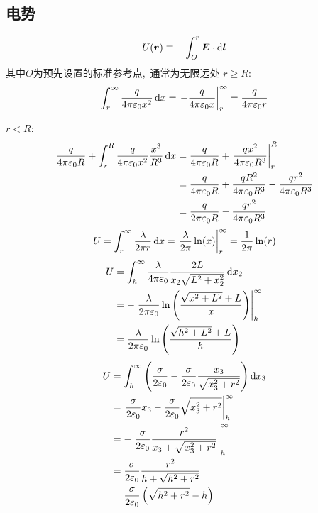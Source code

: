 \subsection{电势}
\begin{equation}
    U(\boldsymbol{r})\equiv-\int_{O}^{r}\boldsymbol{E}\cdot\dif\boldsymbol{l}
\end{equation}
其中$O$为预先设置的标准参考点, \,通常为无限远处
$r\ge R$:
\begin{align*}
    \int_{r}^{\infty}\dfrac{q }{4\pi\varepsilon_0x^2}\dif x=
    \left.-\dfrac{q }{4\pi\varepsilon_0x}\right|_{r}^{\infty}
    =\dfrac{q }{4\pi\varepsilon_0r}
\end{align*}

$r<R$:
\begin{align*}
    \dfrac{q }{4\pi\varepsilon_0R}+\int_{r}^{R}\dfrac{q }{4\pi\varepsilon_0x^2}\frac{x^3}{R^3}\dif x
    &=\dfrac{q }{4\pi\varepsilon_0R}+\left.\dfrac{qx^2}{4\pi\varepsilon_0R^3}\right|_{r}^{R}\\
    &=\dfrac{q }{4\pi\varepsilon_0R}
    +\dfrac{qR^2}{4\pi\varepsilon_0R^3}
    -\dfrac{qr^2}{4\pi\varepsilon_0R^3}\\
    &=\dfrac{q }{2\pi\varepsilon_0R}-\dfrac{qr^2}{4\pi\varepsilon_0R^3}
\end{align*}
\begin{align*}
    U=\int_r^\infty\frac{\lambda}{2\pi r}\dif x=
    \left.\frac{\lambda}{2\pi}\ln(x)\right|_r^\infty
    =\frac{1}{2\pi}\ln(r)
\end{align*}
\begin{align*}
    U&=\int_{h}^{\infty}\frac{\lambda}{4\pi\varepsilon_0}\frac{2L}{x_2\sqrt{L^2+x_2^2}}\dif x_2\\
    &=-\left.\frac{\lambda}{2\pi\varepsilon_0}\ln\left(\frac{\sqrt{x^2+L^2}+L}{x}\right)\right|_{h}^{\infty}
    \\
&=\frac{\lambda}{2\pi\varepsilon_0}\ln\left(\frac{\sqrt{h^2+L^2}+L}{h}\right)
\end{align*}
\label{圆片上方电势}
\begin{align*}
    U&=\int_{h}^{\infty}\left(\frac{\sigma }{2\varepsilon_0}
    -\frac{\sigma }{2\varepsilon_0}\frac{x_3}{\sqrt{x_3^2+r^2}}\right)\dif x_3\\
    &=\left.\frac{\sigma }{2\varepsilon_0}x_3
    -\frac{\sigma }{2\varepsilon_0}{\sqrt{x_3^2+r^2}}\right|_{h}^{\infty}\\
    &=-\left.\frac{\sigma }{2\varepsilon_0}\frac{r^2}{x_3+\sqrt{x_3^2+r^2}}\right|_{h}^{\infty}\\
    &=\frac{\sigma }{2\varepsilon_0}\frac{r^2}{h+\sqrt{h^2+r^2}}\\
    &=\frac{\sigma }{2\varepsilon_0}\left(\sqrt{h^2+r^2}-h\right)
\end{align*}

